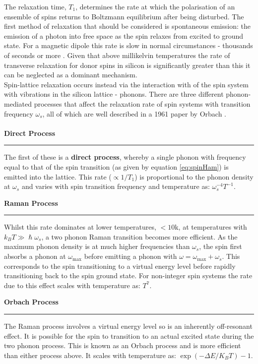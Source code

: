 The relaxation time, $T_1$, determines the rate at which the polarisation of an ensemble of spins returns to Boltzmann equilibrium after being disturbed.
The first method of relaxation that should be considered is spontaneous emission: the emission of a photon into free space as the spin relaxes from excited to ground state.
For a magnetic dipole this rate is slow in normal circumstances - thousands of seconds or more \cite{schweiger2001principles,Baranov2017}.
Given that above millikelvin temperatures the rate of transverse relaxation for donor spins in silicon is significantly greater than this it can be neglected as a dominant mechanism.
\\
Spin-lattice relaxation occurs instead via the interaction with of the spin system with vibrations in the silicon lattice - phonons.
There are three different phonon-mediated processes that affect the relaxation rate of spin systems with transition frequency $\omega_s$, all of which are well described in a 1961 paper by Orbach \cite{VanVleck1940,Orbach1961}.
\\
\\
\textbf{Direct Process}
\\
\noindent\rule{\columnwidth}{1pt}
\begin{adjustwidth}{1.5cm}{}
The first of these is a \textbf{direct process}, whereby a single phonon with frequency equal to that of the spin transition (as given by equation \ref{eq:spinHam}) is emitted into the lattice.
This rate ($\propto 1/T_1$) is proportional to the phonon density at $\omega_s$ and varies with spin transition frequency and temperature as: $\omega_s^{-4}T^{-1}$.
\\
\end{adjustwidth}
\textbf{Raman Process}
\par\noindent\rule{\columnwidth}{1pt}
\begin{adjustwidth}{1.5cm}{}
Whilst this rate dominates at lower temperatures, $<10$k, at temperatures with $k_BT \gg \hslash\omega_s$, a two phonon Raman transition becomes more efficient.
As the maximum phonon density is at much higher frequencies than $\omega_s$, the spin first absorbs a phonon at $\omega_{\text{max}}$ before emitting a phonon with $\omega = \omega_{\text{max}} + \omega_s$.
This corresponds to the spin transitioning to a virtual energy level before rapidly transitioning back to the spin ground state.
For non-integer spin systems the rate due to this effect scales with temperature as: $T^{7}$.
\\
\end{adjustwidth}
\textbf{Orbach Process}
\\
\noindent\rule{\columnwidth}{1pt}
\begin{adjustwidth}{1.5cm}{}
The Raman process involves a virtual energy level so is an inherently off-resonant effect.
It is possible for the spin to transition to an actual excited state during the two phonon process.
This is known as an Orbach process and is more efficient than either process above.
It scales with temperature as: $\exp\left({-\Delta E/K_BT}\right)-1$.
\\
\end{adjustwidth}

